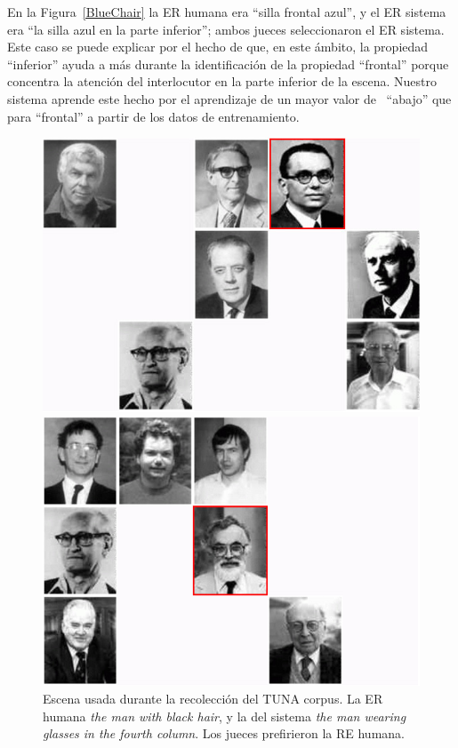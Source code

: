 En la Figura~\ref{BlueChair} la ER humana era ``silla frontal azul'', y el ER sistema era ``la silla azul en la parte inferior''; ambos jueces seleccionaron el ER sistema. Este caso se puede explicar por el hecho de que, en este \'ambito, la propiedad ``inferior'' ayuda a m\'as durante la identificaci\'on de la propiedad ``frontal'' porque concentra la atenci\'on del interlocutor en la parte inferior de la escena. Nuestro sistema aprende este hecho por el aprendizaje de un mayor valor de \puse\ ``abajo'' que para ``frontal'' a partir de los datos de entrenamiento.

\begin{figure}[h]
\begin{minipage}{0.48\linewidth}
\centering
\includegraphics[width=\textwidth]{images/s59t26.jpg}
\caption{Escena usada durante la recolecci\'on del TUNA corpus. La ER humana \emph{the man with black hair}, y la del sistema \emph{the man wearing glasses in the fourth column}. Los jueces prefirieron la RE humana.}
\label{s28t25}
\end{minipage}
\hspace*{.04cm}
\begin{minipage}{0.48\linewidth}
\centering
\includegraphics[width=\textwidth]{images/s315t21.jpg}

\end{minipage}
\end{figure}
